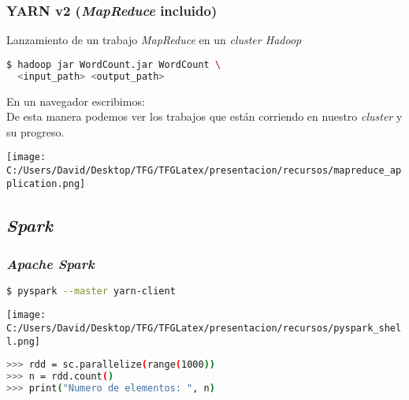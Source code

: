 \documentclass{beamer}
\begin{document}

\begin{frame}[fragile]
  \frametitle{YARN v2 (\textit{MapReduce} incluido)}
  Lanzamiento de un trabajo \textit{MapReduce} en un \textit{cluster Hadoop}
  \begin{lstlisting}[language=bash, numbers=none, frame=single]
$ hadoop jar WordCount.jar WordCount \
  <input_path> <output_path>
  \end{lstlisting}
  
  En un navegador escribimos: \\
  De esta manera podemos ver los trabajos que están corriendo en nuestro \textit{cluster} y su progreso.
  
  \texttt{[image: C:/Users/David/Desktop/TFG/TFGLatex/presentacion/recursos/mapreduce\_application.png]}
  
\end{frame}

\subsection{\textit{Spark}}

\begin{frame}[fragile]
\frametitle{\textit{Apache Spark}}

\begin{block}{}
\begin{lstlisting}[language=bash, numbers=none, frame=single]
$ pyspark --master yarn-client
\end{lstlisting}
\end{block}

\texttt{[image: C:/Users/David/Desktop/TFG/TFGLatex/presentacion/recursos/pyspark\_shell.png]}

\begin{block}{}
\begin{lstlisting}[language=bash, numbers=none, frame=single, showstringspaces=false]
>>> rdd = sc.parallelize(range(1000))
>>> n = rdd.count()
>>> print("Numero de elementos: ", n)
\end{lstlisting}
\end{block}

\end{frame}

\end{document}
